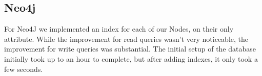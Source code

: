 \subsection{Neo4j}
For Neo4J we implemented an index for each of our Nodes, on their only attribute. While the improvement for read queries wasn't very noticeable, the improvement for write queries was substantial. The initial setup of the database initially took up to an hour to complete, but after adding indexes, it only took a few seconds.